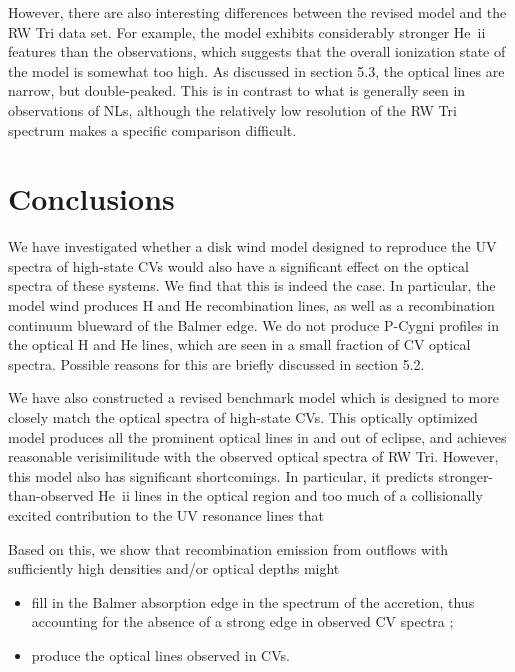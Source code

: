 \documentclass[preprint, a4paper, 11pt]{aastex}
\begin{document}
However, there are also interesting differences between the revised
model and the RW Tri data set. For example, the model exhibits
considerably stronger He~{\sc ii} features than the observations,
which suggests that the overall ionization state of the model is
somewhat too high. 
As discussed in section 5.3, the optical lines are
narrow, but double-peaked. 
This is in contrast to what is generally seen in observations
of NLs, although the relatively low resolution of the RW Tri
spectrum makes a specific comparison difficult.


\newpage




%
%


\section{Conclusions}

We have investigated whether a disk wind model designed to reproduce
the UV spectra of high-state CVs would also have a significant effect
on the optical spectra of these systems. We find that this is indeed
the case. In particular, the model wind produces H and He
recombination lines, as well as a recombination continuum blueward of
the Balmer edge. We do not produce P-Cygni profiles
in the optical H and He lines, 
which are seen in a small fraction of CV optical spectra.
Possible reasons for this are briefly discussed in section 
5.2.

We have also constructed a revised benchmark model which is designed
to more closely match the optical spectra of high-state CVs. This
optically optimized model produces all the prominent optical lines in
and out of eclipse, and achieves reasonable verisimilitude with the
observed optical spectra of RW Tri. However, this model also has
significant shortcomings. In particular, it predicts
stronger-than-observed He~{\sc ii} lines in the optical region and too
much of a collisionally excited contribution to the UV resonance lines
that  

Based on this, we show that recombination emission 
from outflows with sufficiently high densities and/or optical depths might 

\renewcommand{\labelitemi}{$\bullet$}
\begin{itemize}
	\item fill in the Balmer absorption edge in the spectrum of
          the accretion, thus accounting for the absence of a strong edge in
          observed CV spectra \citep{KLWB98};
	\item produce the optical lines observed in CVs.
\end{itemize}
\smallskip
\end{document}
